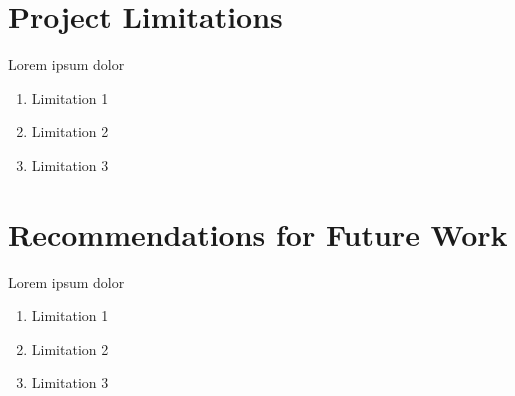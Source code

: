 \section{Project Limitations}
Lorem ipsum dolor
\begin{enumerate}[1.]
    \item Limitation 1
    \item Limitation 2
    \item Limitation 3
\end{enumerate}

\section{Recommendations for Future Work}
Lorem ipsum dolor
\begin{enumerate}[1.]
    \item Limitation 1
    \item Limitation 2
    \item Limitation 3
\end{enumerate}